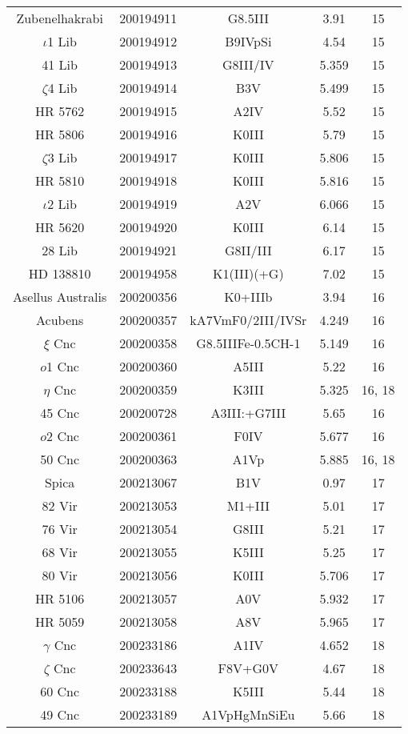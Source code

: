 \begin{table*}
\begin{tabular}{ccccc}
Zubenelhakrabi & 200194911 & G8.5III & 3.91 & 15 \\
$\iota$1 Lib & 200194912 & B9IVpSi & 4.54 & 15 \\
41 Lib & 200194913 & G8III/IV & 5.359 & 15 \\
$\zeta$4 Lib & 200194914 & B3V & 5.499 & 15 \\
HR 5762 & 200194915 & A2IV & 5.52 & 15 \\
HR 5806 & 200194916 & K0III & 5.79 & 15 \\
$\zeta$3 Lib & 200194917 & K0III & 5.806 & 15 \\
HR 5810 & 200194918 & K0III & 5.816 & 15 \\
$\iota$2 Lib & 200194919 & A2V & 6.066 & 15 \\
HR 5620 & 200194920 & K0III & 6.14 & 15 \\
28 Lib & 200194921 & G8II/III & 6.17 & 15 \\
HD 138810 & 200194958 & K1(III)(+G) & 7.02 & 15 \\
Asellus Australis & 200200356 & K0+IIIb & 3.94 & 16 \\
Acubens & 200200357 & kA7VmF0/2III/IVSr & 4.249 & 16 \\
$\xi$ Cnc & 200200358 & G8.5IIIFe-0.5CH-1 & 5.149 & 16 \\
$o$1 Cnc & 200200360 & A5III & 5.22 & 16 \\
$\eta$ Cnc & 200200359 & K3III & 5.325 & 16, 18 \\
45 Cnc & 200200728 & A3III:+G7III & 5.65 & 16 \\
$o$2 Cnc & 200200361 & F0IV & 5.677 & 16 \\
50 Cnc & 200200363 & A1Vp & 5.885 & 16, 18 \\
Spica & 200213067 & B1V & 0.97 & 17 \\
82 Vir & 200213053 & M1+III & 5.01 & 17 \\
76 Vir & 200213054 & G8III & 5.21 & 17 \\
68 Vir & 200213055 & K5III & 5.25 & 17 \\
80 Vir & 200213056 & K0III & 5.706 & 17 \\
HR 5106 & 200213057 & A0V & 5.932 & 17 \\
HR 5059 & 200213058 & A8V & 5.965 & 17 \\
$\gamma$ Cnc & 200233186 & A1IV & 4.652 & 18 \\
$\zeta$ Cnc & 200233643 & F8V+G0V & 4.67 & 18 \\
60 Cnc & 200233188 & K5III & 5.44 & 18 \\
49 Cnc & 200233189 & A1VpHgMnSiEu & 5.66 & 18 \\

\end{tabular}
\end{table*}
